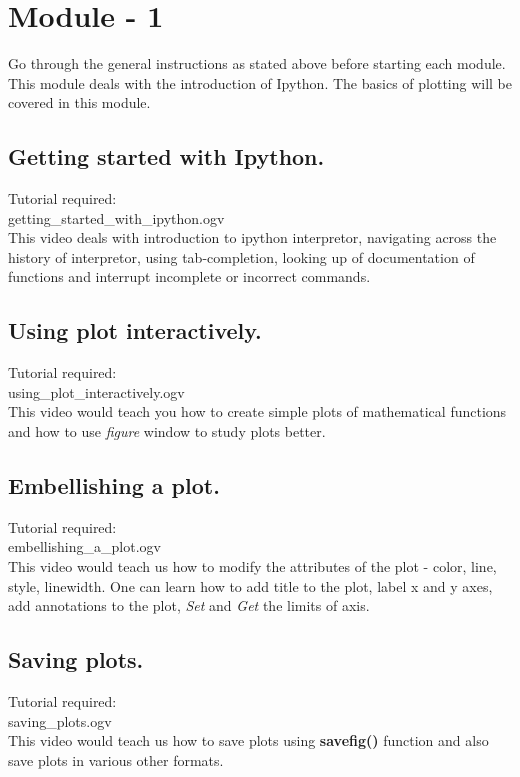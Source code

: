 \documentclass[11pt,twocolumn]{article}
\begin{document}
\section{Module - 1}
Go through the general instructions as stated above before starting each module.\\
  This module deals with the introduction of Ipython. The basics of plotting will be covered in this module.
  \subsection{Getting started with Ipython.}
    Tutorial required: \\getting\_started\_with\_ipython.ogv \\ 
    This video deals with introduction to ipython interpretor, navigating across the history of interpretor, using tab-completion, looking up of documentation of functions and interrupt incomplete or incorrect commands.

 
    \subsection{Using plot interactively.}
   Tutorial required: \\using\_plot\_interactively.ogv \\
    This video would teach you how to create simple plots of mathematical functions and how to use \emph{figure} window to study plots better. 

    \subsection{Embellishing a plot.}
    Tutorial required:\\ embellishing\_a\_plot.ogv\\
      This video would teach us how to modify the attributes of the plot - color, line, style, linewidth. One can learn how to add title to the plot, label x and y axes, add annotations to the plot, \emph{Set} and \emph{Get} the limits of axis.

    \subsection{Saving plots.}
    Tutorial required: \\ saving\_plots.ogv \\
    
      This video would teach us how to save plots using \textbf{savefig()} function and also save plots in various other formats.
\end{document}
